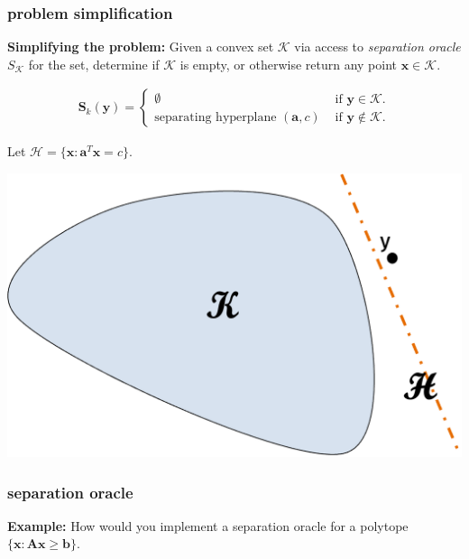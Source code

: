 \documentclass[compress]{beamer}
\newcommand{\bv}[1]{\mathbf{#1}}
\begin{document}
\begin{frame}[t]
	\frametitle{problem simplification}
	\small
		\textbf{Simplifying the problem:}
		Given a convex set $\mathcal{K}$ via access to \emph{separation oracle} $S_\mathcal{K}$ for the set, determine if $\mathcal{K}$ is empty, or otherwise return any point $\bv{x}\in \mathcal{K}$. 
		\vspace{-2em}
		
		\begin{align*}
			\bv{S}_k(\bv{y}) = \begin{cases}
				\emptyset &\text{ if } \bv{y} \in \mathcal{K}. \\
				\text{separating hyperplane } (\bv{a},c) &\text{ if } \bv{y} \notin \mathcal{K}.
			\end{cases}
		\end{align*}
	
	Let $\mathcal{H} = \{\bv{x}: \bv{a}^T\bv{x} = c\}$.
	\vspace{-1em}
		\begin{center}
			\includegraphics[width=.65\textwidth]{seperationoracle.png}
		\end{center}
	
\end{frame}

\begin{frame}[t]
	\frametitle{separation oracle}
	\textbf{Example:} How would you implement a separation oracle for a polytope $\{\bv{x}: \bv{A}\bv{x} \geq \bv{b}\}$. 
\end{frame}
\end{document}
